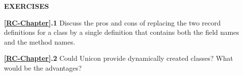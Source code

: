 \bigskip

\noindent\textbf{EXERCISES}

\noindent\textbf{\ref*{RC-Chapter}.1}
Discuss the pros and cons of replacing the two record definitions for a
class by a single definition that contains both the field names and the
method names.

\noindent\textbf{\ref*{RC-Chapter}.2}
Could Unicon provide dynamically created classes? What would be the advantages?
